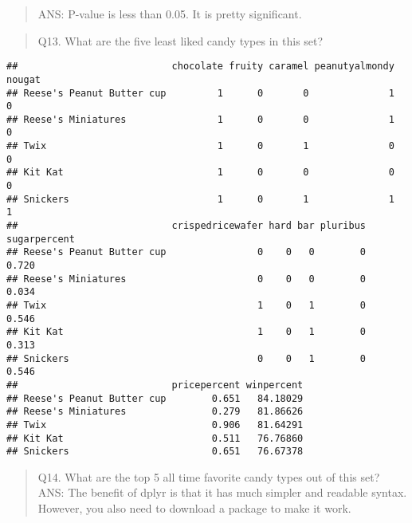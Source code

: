 \documentclass[
]{article}
\newenvironment{Shaded}{\begin{snugshade}}{\end{snugshade}}
\newcommand{\AttributeTok}[1]{\textcolor[rgb]{0.13,0.29,0.53}{#1}}
\newcommand{\DecValTok}[1]{\textcolor[rgb]{0.00,0.00,0.81}{#1}}
\newcommand{\FunctionTok}[1]{\textcolor[rgb]{0.13,0.29,0.53}{\textbf{#1}}}
\newcommand{\NormalTok}[1]{#1}
\newcommand{\SpecialCharTok}[1]{\textcolor[rgb]{0.81,0.36,0.00}{\textbf{#1}}}
\begin{document}
\begin{quote}
ANS: P-value is less than 0.05. It is pretty significant.
\end{quote}

\begin{quote}
Q13. What are the five least liked candy types in this set?
\end{quote}

\begin{Shaded}
\end{Shaded}

\begin{verbatim}
##                           chocolate fruity caramel peanutyalmondy nougat
## Reese's Peanut Butter cup         1      0       0              1      0
## Reese's Miniatures                1      0       0              1      0
## Twix                              1      0       1              0      0
## Kit Kat                           1      0       0              0      0
## Snickers                          1      0       1              1      1
##                           crispedricewafer hard bar pluribus sugarpercent
## Reese's Peanut Butter cup                0    0   0        0        0.720
## Reese's Miniatures                       0    0   0        0        0.034
## Twix                                     1    0   1        0        0.546
## Kit Kat                                  1    0   1        0        0.313
## Snickers                                 0    0   1        0        0.546
##                           pricepercent winpercent
## Reese's Peanut Butter cup        0.651   84.18029
## Reese's Miniatures               0.279   81.86626
## Twix                             0.906   81.64291
## Kit Kat                          0.511   76.76860
## Snickers                         0.651   76.67378
\end{verbatim}

\begin{quote}
Q14. What are the top 5 all time favorite candy types out of this set?
ANS: The benefit of dplyr is that it has much simpler and readable
syntax. However, you also need to download a package to make it work.
\end{quote}
\end{document}
